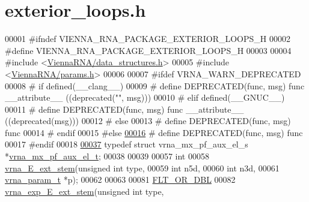 \hypertarget{exterior__loops_8h_source}{}\section{exterior\+\_\+loops.\+h}
\label{exterior__loops_8h_source}

\begin{DoxyCode}
00001 \textcolor{preprocessor}{#ifndef VIENNA\_RNA\_PACKAGE\_EXTERIOR\_LOOPS\_H}
00002 \textcolor{preprocessor}{#define VIENNA\_RNA\_PACKAGE\_EXTERIOR\_LOOPS\_H}
00003 
00004 \textcolor{preprocessor}{#include <\mbox{\hyperlink{data__structures_8h}{ViennaRNA/data\_structures.h}}>}
00005 \textcolor{preprocessor}{#include <\mbox{\hyperlink{params_8h}{ViennaRNA/params.h}}>}
00006 
00007 \textcolor{preprocessor}{#ifdef VRNA\_WARN\_DEPRECATED}
00008 \textcolor{preprocessor}{# if defined(\_\_clang\_\_)}
00009 \textcolor{preprocessor}{#  define DEPRECATED(func, msg) func \_\_attribute\_\_ ((deprecated("", msg)))}
00010 \textcolor{preprocessor}{# elif defined(\_\_GNUC\_\_)}
00011 \textcolor{preprocessor}{#  define DEPRECATED(func, msg) func \_\_attribute\_\_ ((deprecated(msg)))}
00012 \textcolor{preprocessor}{# else}
00013 \textcolor{preprocessor}{#  define DEPRECATED(func, msg) func}
00014 \textcolor{preprocessor}{# endif}
00015 \textcolor{preprocessor}{#else}
\mbox{\hyperlink{exterior__loops_8h_aab347a3c03fbe8e7319551b9fa0cce4a}{00016}} \textcolor{preprocessor}{# define DEPRECATED(func, msg) func}
00017 \textcolor{preprocessor}{#endif}
00018 
\mbox{\hyperlink{group__loops_gaf9d5160c11ffad3ec258124a77fee13c}{00037}} \textcolor{keyword}{typedef} \textcolor{keyword}{struct }vrna\_mx\_pf\_aux\_el\_s *\mbox{\hyperlink{group__loops_gaf9d5160c11ffad3ec258124a77fee13c}{vrna\_mx\_pf\_aux\_el\_t}};
00038 
00039 
00057 \textcolor{keywordtype}{int}
00058 \mbox{\hyperlink{group__loops_gaa0c313c90da11aa741dcd62746d85337}{vrna\_E\_ext\_stem}}(\textcolor{keywordtype}{unsigned} \textcolor{keywordtype}{int}  type,
00059                 \textcolor{keywordtype}{int}           n5d,
00060                 \textcolor{keywordtype}{int}           n3d,
00061                 \mbox{\hyperlink{group__energy__parameters_structvrna__param__s}{vrna\_param\_t}}  *p);
00062 
00063 
00081 \mbox{\hyperlink{group__data__structures_ga31125aeace516926bf7f251f759b6126}{FLT\_OR\_DBL}}
00082 \mbox{\hyperlink{group__loops_ga357484958d3cd677f88f16c75c8a5730}{vrna\_exp\_E\_ext\_stem}}(\textcolor{keywordtype}{unsigned} \textcolor{keywordtype}{int}      type,

\end{DoxyCode}
